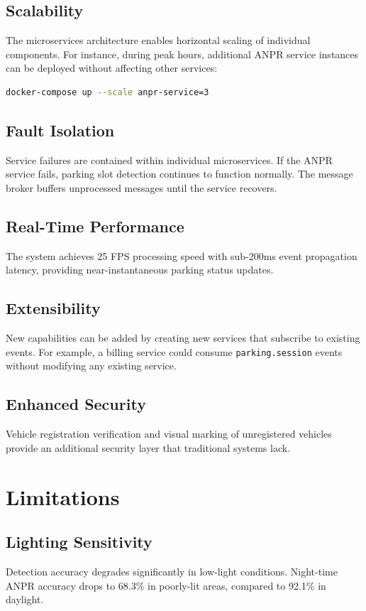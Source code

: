 \documentclass[12pt,a4paper]{report}
\begin{document}
\subsection{Scalability}
The microservices architecture enables horizontal scaling of individual components. For instance, during peak hours, additional ANPR service instances can be deployed without affecting other services:
\begin{lstlisting}[language=bash]
docker-compose up --scale anpr-service=3
\end{lstlisting}

\subsection{Fault Isolation}
Service failures are contained within individual microservices. If the ANPR service fails, parking slot detection continues to function normally. The message broker buffers unprocessed messages until the service recovers.

\subsection{Real-Time Performance}
The system achieves 25 FPS processing speed with sub-200ms event propagation latency, providing near-instantaneous parking status updates.

\subsection{Extensibility}
New capabilities can be added by creating new services that subscribe to existing events. For example, a billing service could consume \texttt{parking.session} events without modifying any existing service.

\subsection{Enhanced Security}
Vehicle registration verification and visual marking of unregistered vehicles provide an additional security layer that traditional systems lack.

\section{Limitations}

\subsection{Lighting Sensitivity}
Detection accuracy degrades significantly in low-light conditions. Night-time ANPR accuracy drops to 68.3\% in poorly-lit areas, compared to 92.1\% in daylight.
\end{document}
